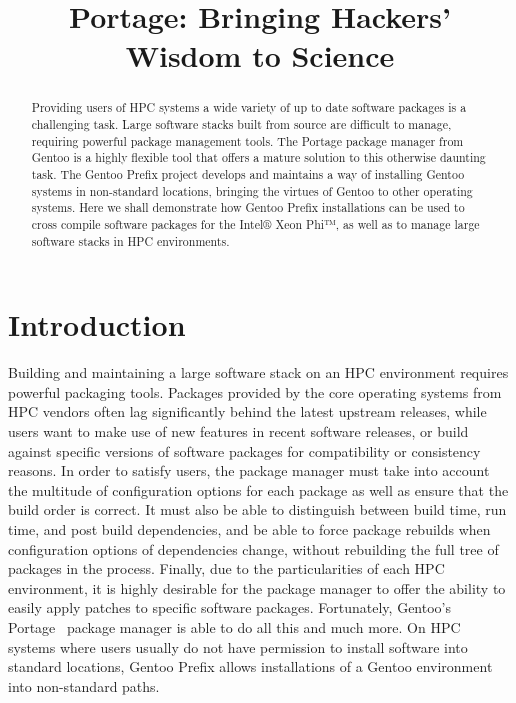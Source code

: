 \documentclass[a4paper,conference]{IEEEtran}
\title{Portage: Bringing Hackers' Wisdom to Science}
\author{
  \IEEEauthorblockN{Guilherme Amadio}
  \IEEEauthorblockA{São Paulo State University, Brazil\\
                    Gentoo Linux\\amadio@gentoo.org}
  \and
  \IEEEauthorblockN{Benda Xu}
  \IEEEauthorblockA{The University of Tokyo, Japan\\
                    Gentoo Linux\\heroxbd@gentoo.org}
}
\begin{document}
\maketitle

\begin{abstract}

Providing users of HPC systems a wide variety of up to date software
packages is a challenging task. Large software stacks built from source
are difficult to manage, requiring powerful package management tools.
The Portage package manager from Gentoo is a highly flexible tool that
offers a mature solution to this otherwise daunting task. The Gentoo
Prefix project develops and maintains a way of installing Gentoo systems
in non-standard locations, bringing the virtues of Gentoo to other
operating systems. Here we shall demonstrate how Gentoo Prefix
installations can be used to cross compile software packages for the
Intel® Xeon Phi™, as well as to manage large software stacks in HPC
environments.

\end{abstract}

\section{Introduction}

Building and maintaining a large software stack on an HPC environment
requires powerful packaging tools. Packages provided by the core operating
systems from HPC vendors often lag significantly behind the latest
upstream releases, while users want to make use of new features in
recent software releases, or build against specific versions of software
packages for compatibility or consistency reasons. In order to satisfy
users, the package manager must take into account the multitude of
configuration options for each package as well as ensure that the build
order is correct. It must also be able to distinguish between build
time, run time, and post build dependencies, and be able to force
package rebuilds when configuration options of dependencies change,
without rebuilding the full tree of packages in the process. Finally,
due to the particularities of each HPC environment, it is highly
desirable for the package manager to offer the ability to easily apply
patches to specific software packages. Fortunately,
Gentoo's~\cite{gentoo} Portage~\cite{gentoo:portage} package manager is
able to do all this and much more. On HPC systems where users usually do
not have permission to install software into standard locations, Gentoo
Prefix \cite{gentoo:prefix} allows installations of a Gentoo environment
into non-standard paths.
\end{document}
